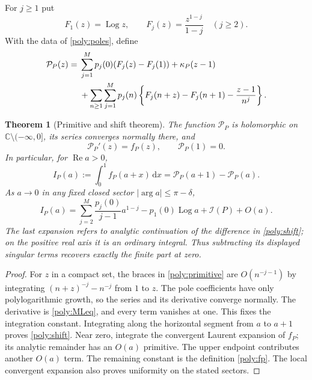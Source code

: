 \documentclass[11pt,a4paper]{article}
\numberwithin{equation}{section}
\newtheorem{theorem}{Theorem}[section]
\theoremstyle{definition}
\theoremstyle{remark}
\DeclareMathOperator{\Log}{Log}
\DeclareMathOperator{\re}{Re}
\newcommand{\dd}{\,\mathrm d}
\newcommand{\C}{\mathbb C}
\newcommand{\cI}{\mathcal I}
\begin{document}
For $j\ge1$ put
\[
 F_1(z)=\Log z,\qquad F_j(z)=\frac{z^{1-j}}{1-j}\quad(j\ge2).
\]
With the data of \eqref{poly:poles}, define
\begin{align}\label{poly:primitive}
 \mathcal P_P(z)={}&\sum_{j=1}^Mp_j(0)(F_j(z)-F_j(1))
                  +\kappa_P(z-1)\notag\\
 &+\sum_{n\ge1}\sum_{j=1}^Mp_j(n)
 \left\{F_j(n+z)-F_j(n+1)-\frac{z-1}{n^j}\right\}.
\end{align}

\begin{theorem}[Primitive and shift theorem]
\label{poly:primitivethm}
The function $\mathcal P_P$ is holomorphic on
$\C\setminus(-\infty,0]$, its series converges normally there,
and
\begin{equation}\label{poly:primitiveidentity}
 \mathcal P_P'(z)=f_P(z),\qquad \mathcal P_P(1)=0.
\end{equation}
In particular, for $\re a>0$,
\begin{equation}\label{poly:shift}
 I_P(a):=\int_0^1f_P(a+x)\dd x
        =\mathcal P_P(a+1)-\mathcal P_P(a).
\end{equation}
As $a\to0$ in any fixed closed sector $|\arg a|\le\pi-\delta$,
\begin{equation}\label{poly:shiftlimit}
 I_P(a)=\sum_{j=2}^M\frac{p_j(0)}{j-1}a^{1-j}
          -p_1(0)\Log a+\cI(P)+O(a).
\end{equation}
The last expansion refers to analytic continuation of the difference
in \eqref{poly:shift}; on the positive real axis it is an ordinary
integral. Thus subtracting its displayed singular terms recovers
exactly the finite part at zero.
\end{theorem}

\begin{proof}
For $z$ in a compact set, the braces in \eqref{poly:primitive}
are $O(n^{-j-1})$ by integrating
$(n+z)^{-j}-n^{-j}$ from $1$ to $z$. The pole coefficients have only
polylogarithmic growth, so the series and its derivative converge
normally. The derivative is \eqref{poly:MLeq}, and every term vanishes
at one. This fixes the integration constant.
Integrating along the horizontal segment from $a$ to $a+1$ proves
\eqref{poly:shift}. Near zero, integrate the convergent Laurent expansion
of $f_P$; its analytic remainder has an $O(a)$ primitive. The upper
endpoint contributes another $O(a)$ term. The remaining constant is
the definition \eqref{poly:fp}. The local convergent expansion also
proves uniformity on the stated sectors.
\end{proof}
\end{document}
